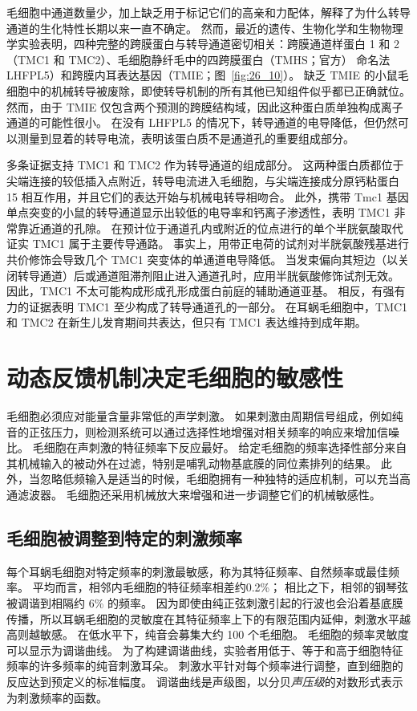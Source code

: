 毛细胞中通道数量少，加上缺乏用于标记它们的高亲和力配体，解释了为什么转导通道的生化特性长期以来一直不确定。
然而，最近的遗传、生物化学和生物物理学实验表明，四种完整的跨膜蛋白与转导通道密切相关：跨膜通道样蛋白 1 和 2（TMC1 和 TMC2）、毛细胞静纤毛中的四跨膜蛋白（TMHS；官方） 命名法 LHFPL5）和跨膜内耳表达基因（TMIE；图~\ref{fig:26_10}）。
缺乏 TMIE 的小鼠毛细胞中的机械转导被废除，即使转导机制的所有其他已知组件似乎都已正确就位。
然而，由于 TMIE 仅包含两个预测的跨膜结构域，因此这种蛋白质单独构成离子通道的可能性很小。
在没有 LHFPL5 的情况下，转导通道的电导降低，但仍然可以测量到显着的转导电流，表明该蛋白质不是通道孔的重要组成部分。


多条证据支持 TMC1 和 TMC2 作为转导通道的组成部分。
这两种蛋白质都位于尖端连接的较低插入点附近，转导电流进入毛细胞，与尖端连接成分原钙粘蛋白 15 相互作用，并且它们的表达开始与机械电转导相吻合。
此外，携带 Tmc1 基因单点突变的小鼠的转导通道显示出较低的电导率和钙离子渗透性，表明 TMC1 非常靠近通道的孔隙。
在预计位于通道孔内或附近的位点进行的单个半胱氨酸取代证实 TMC1 属于主要传导通路。
事实上，用带正电荷的试剂对半胱氨酸残基进行共价修饰会导致几个 TMC1 突变体的单通道电导降低。
当发束偏向其短边（以关闭转导通道）后或通道阻滞剂阻止进入通道孔时，应用半胱氨酸修饰试剂无效。 
因此，TMC1 不太可能构成形成孔形成蛋白前庭的辅助通道亚基。
相反，有强有力的证据表明 TMC1 至少构成了转导通道孔的一部分。
在耳蜗毛细胞中，TMC1 和 TMC2 在新生儿发育期间共表达，但只有 TMC1 表达维持到成年期。



\section{动态反馈机制决定毛细胞的敏感性}

毛细胞必须应对能量含量非常低的声学刺激。
如果刺激由周期信号组成，例如纯音的正弦压力，则检测系统可以通过选择性地增强对相关频率的响应来增加信噪比。
毛细胞在声刺激的特征频率下反应最好。
给定毛细胞的频率选择性部分来自其机械输入的被动外在过滤，特别是哺乳动物基底膜的同位素排列的结果。
此外，当忽略低频输入是适当的时候，毛细胞拥有一种独特的适应机制，可以充当高通滤波器。
毛细胞还采用机械放大来增强和进一步调整它们的机械敏感性。



\subsection{毛细胞被调整到特定的刺激频率}

每个耳蜗毛细胞对特定频率的刺激最敏感，称为其特征频率、自然频率或最佳频率。
平均而言，相邻内毛细胞的特征频率相差约0.2\%；
相比之下，相邻的钢琴弦被调谐到相隔约 6\% 的频率。 
因为即使由纯正弦刺激引起的行波也会沿着基底膜传播，所以耳蜗毛细胞的灵敏度在其特征频率上下的有限范围内延伸，刺激水平越高则越敏感。
在低水平下，纯音会募集大约 100 个毛细胞。
毛细胞的频率灵敏度可以显示为调谐曲线。
为了构建调谐曲线，实验者用低于、等于和高于细胞特征频率的许多频率的纯音刺激耳朵。
刺激水平针对每个频率进行调整，直到细胞的反应达到预定义的标准幅度。
调谐曲线是声级图，以分贝\textit{声压级}的对数形式表示为刺激频率的函数。


